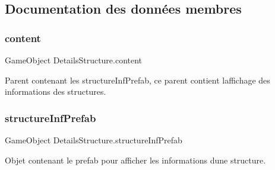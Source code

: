 \subsection{Documentation des données membres}
\mbox{\label{class_details_structure_a404d66a2438aa2f6e020461d9e6a442a}} 
\subsubsection{\texorpdfstring{content}{content}}
{\footnotesize\ttfamily Game\+Object Details\+Structure.\+content\hspace{0.3cm}{\ttfamily [private]}}



Parent contenant les structure\+Inf\+Prefab, ce parent contient l\textquotesingle{}affichage des informations des structures. 

\mbox{\label{class_details_structure_a82f791c8215e3b995b78a35e5156814b}} 
\subsubsection{\texorpdfstring{structure\+Inf\+Prefab}{structureInfPrefab}}
{\footnotesize\ttfamily Game\+Object Details\+Structure.\+structure\+Inf\+Prefab\hspace{0.3cm}{\ttfamily [private]}}



Objet contenant le prefab pour afficher les informations d\textquotesingle{}une structure. 

